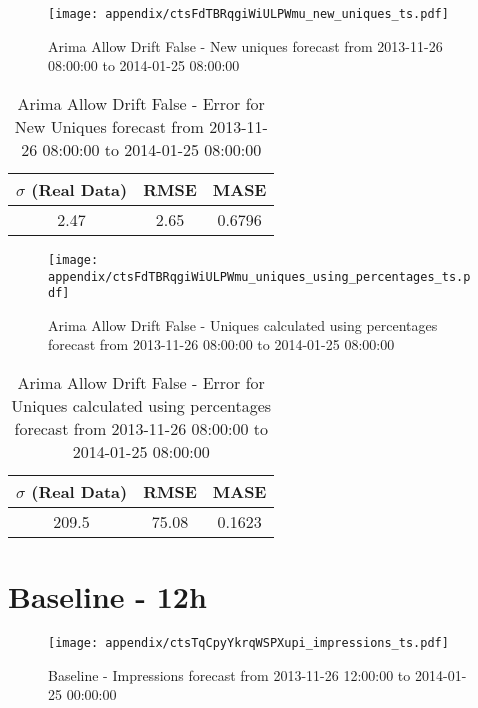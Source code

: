 \begin{figure}[H] \begin{center} \leavevmode
\texttt{[image: appendix/ctsFdTBRqgiWiULPWmu\_new\_uniques\_ts.pdf]} \caption{
Arima Allow Drift False - New uniques forecast from 2013-11-26 08:00:00 to 2014-01-25 08:00:00} \label{fig:appendix/ctsFdTBRqgiWiULPWmu_new_uniques_ts.pdf} \end{center}
\end{figure}

\begin{table}[H]
\centering
\footnotesize
\begin{tabular}{ccc}
$\sigma$ (Real Data) & RMSE & MASE   \\ \hline
2.47 & 2.65 & 0.6796 \\
\end{tabular}

\vspace{0.5cm}

\caption{
Arima Allow Drift False - Error for New Uniques forecast from 2013-11-26 08:00:00 to 2014-01-25 08:00:00}
\end{table}

\begin{figure}[H] \begin{center} \leavevmode
\texttt{[image: appendix/ctsFdTBRqgiWiULPWmu\_uniques\_using\_percentages\_ts.pdf]} \caption{
Arima Allow Drift False - Uniques calculated using percentages forecast from 2013-11-26 08:00:00 to 2014-01-25 08:00:00} \label{fig:appendix/ctsFdTBRqgiWiULPWmu_uniques_using_percentages_ts.pdf} \end{center}
\end{figure}

\begin{table}[H]
\centering
\footnotesize
\begin{tabular}{ccc}
$\sigma$ (Real Data) & RMSE & MASE   \\ \hline
209.5 & 75.08 & 0.1623 \\
\end{tabular}

\vspace{0.5cm}

\caption{
Arima Allow Drift False - Error for Uniques calculated using percentages forecast from 2013-11-26 08:00:00 to 2014-01-25 08:00:00}
\end{table}

\section{Baseline - 12h}
\begin{figure}[H] \begin{center} \leavevmode
\texttt{[image: appendix/ctsTqCpyYkrqWSPXupi\_impressions\_ts.pdf]} \caption{
Baseline - Impressions forecast from 2013-11-26 12:00:00 to 2014-01-25 00:00:00} \label{fig:appendix/ctsTqCpyYkrqWSPXupi_impressions_ts.pdf} \end{center}
\end{figure}


